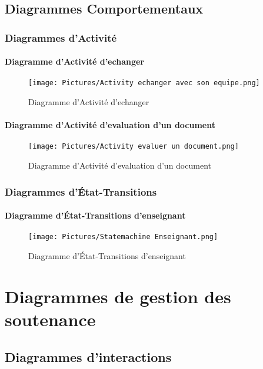 \documentclass[11pt,fleqn]{book} %
\begin{document}
\section{Diagrammes Comportementaux}
\subsection{Diagrammes d’Activité}
\subsubsection{Diagramme d’Activité d'echanger }
\begin{figure}[h]
    \centering
    \texttt{[image: Pictures/Activity echanger avec son equipe.png]}
    \caption{Diagramme d’Activité d'echanger}
    \label{fig:pca}
\end{figure}
\newpage
\subsubsection{Diagramme d’Activité d'evaluation d'un document}
\begin{figure}[h]
    \centering
    \texttt{[image: Pictures/Activity evaluer un document.png]}
    \caption{Diagramme d’Activité d'evaluation d'un document}
    \label{fig:pca}
\end{figure}
\newpage
\subsection{Diagrammes d’État-Transitions}
\subsubsection{Diagramme d’État-Transitions d'enseignant}
\begin{figure}[h]
    \centering
    \texttt{[image: Pictures/Statemachine Enseignant.png]}
    \caption{Diagramme d’État-Transitions d'enseignant}
    \label{fig:pca}
\end{figure}
\chapter{Diagrammes de gestion des soutenance}
\section{Diagrammes d'interactions}
\end{document}
